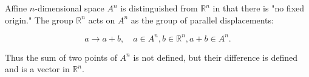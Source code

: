 Affine $n$-dimensional space $A^n$ is distinguished from $\mathbb{R}^n$ in that there is "no fixed origin." The group $\mathbb{R}^n$ acts on $A^n$ as the group of parallel displacements:

$$a \rightarrow a + b, \quad a \in A^n, b \in \mathbb{R}^n, a + b \in A^n.$$

Thus the sum of two points of $A^n$ is not defined, but their difference is defined and is a vector in $\mathbb{R}^n$.
